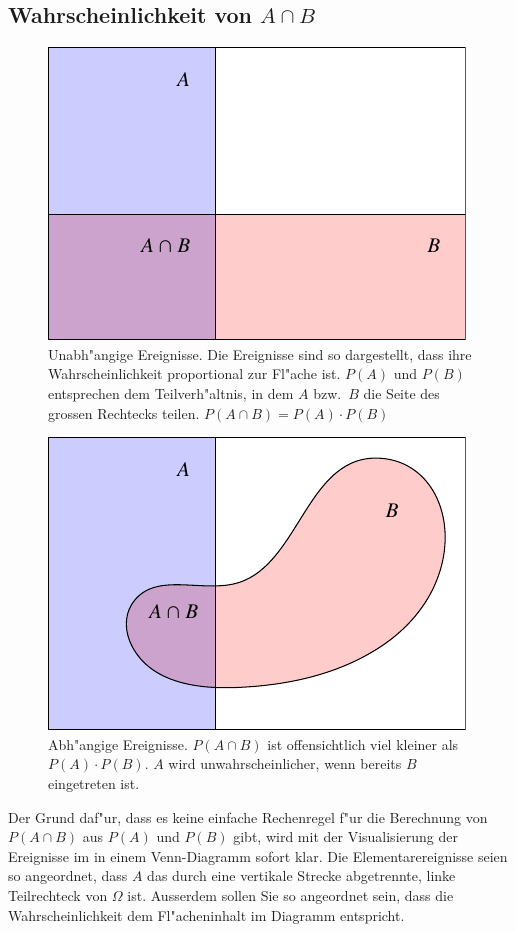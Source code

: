 \subsection{Wahrscheinlichkeit von \texorpdfstring{$A\cap B$}{A geschnitten B}}
\begin{figure}
\begin{center}
\includegraphics{images/abhaengigkeit-1}
\end{center}
\caption{Unabh"angige Ereignisse.
Die Ereignisse sind so dargestellt,
dass ihre Wahrscheinlichkeit proportional zur Fl"ache ist.
$P(A)$ und $P(B)$
entsprechen dem Teilverh"altnis, in dem $A$ bzw.~$B$ die Seite des grossen
Rechtecks teilen.
$P(A\cap B)=P(A)\cdot P(B)$\label{unabhaengig}}
\end{figure}
\begin{figure}
\begin{center}
\includegraphics{images/abhaengigkeit-2}
\end{center}
\caption{Abh"angige Ereignisse.
$P(A\cap B)$ ist offensichtlich viel kleiner
als $P(A)\cdot P(B)$.
$A$ wird unwahrscheinlicher, wenn bereits $B$ eingetreten
ist.
\label{abhaengig}}
\end{figure}
Der Grund daf"ur, dass es keine einfache Rechenregel f"ur die Berechnung von 
$P(A\cap B)$ aus $P(A)$ und $P(B)$ gibt, wird mit der
Visualisierung der Ereignisse im in einem Venn-Diagramm sofort klar.
Die Elementarereignisse seien so angeordnet, dass $A$ das durch eine
vertikale Strecke abgetrennte, linke Teilrechteck von $\Omega$ ist.
Ausserdem
sollen Sie so angeordnet sein, dass die Wahrscheinlichkeit dem
Fl"acheninhalt im Diagramm entspricht.

